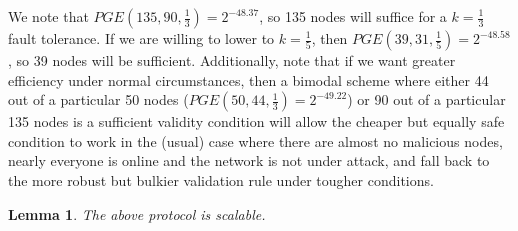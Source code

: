 \documentclass[11pt,a4paper]{report}
\theoremstyle{plain}
\newtheorem{lem}[thm]{Lemma}
\theoremstyle{definition}
\theoremstyle{remark}
\begin{document}
We note that $PGE(135, 90, \frac{1}{3}) = 2^{-48.37}$, so 135 nodes will suffice for a $k = \frac{1}{3}$ fault tolerance. If we are willing to lower to $k = \frac{1}{5}$, then $PGE(39, 31, \frac{1}{5}) = 2^{-48.58}$, so 39 nodes will be sufficient. Additionally, note that if we want greater efficiency under normal circumstances, then a bimodal scheme where either 44 out of a particular 50 nodes ($PGE(50, 44, \frac{1}{3}) = 2^{-49.22}$) or 90 out of a particular 135 nodes is a sufficient validity condition will allow the cheaper but equally safe condition to work in the (usual) case where there are almost no malicious nodes, nearly everyone is online and the network is not under attack, and fall back to the more robust but bulkier validation rule under tougher conditions.

\begin{lem}
The above protocol is scalable.
\end{lem}
\end{document}
